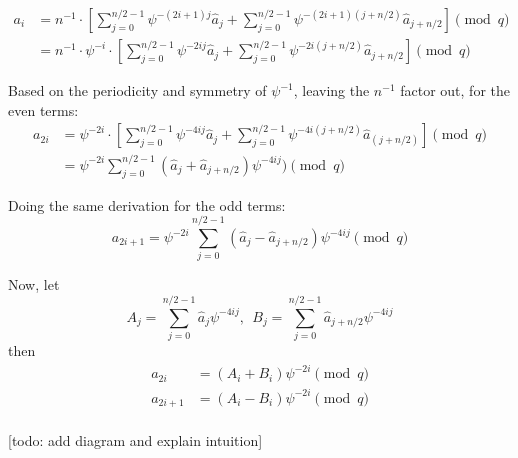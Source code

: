 \documentclass{article}
\begin{document}
\begin{align*}
    a_i &= n^{-1} \cdot \left[ \sum_{j=0}^{n/2-1} \psi^{-(2i + 1)j} \hat{a}_j 
    + \sum_{j=0}^{n/2-1} \psi^{-(2i + 1)(j+n/2)} \hat{a}_{j+n/2} \right] \pmod q \\
	&=  n^{-1} \cdot \psi^{-i} \cdot \left[ \sum_{j=0}^{n/2-1} \psi^{-2ij} \hat{a}_j 
    + \sum_{j=0}^{n/2-1} \psi^{-2i(j+n/2)} \hat{a}_{j+n/2} \right] \pmod q
\end{align*}


Based on the periodicity and symmetry of $\psi^{-1}$, leaving the $n^{-1}$ factor out, for the even terms:
\begin{align*}
    a_{2i} &= \psi^{-2i} \cdot \left[ \sum_{j=0}^{n/2-1} \psi^{-4ij} \hat{a}_j
	+ \sum_{j=0}^{n/2-1} \psi^{-4i(j+n/2)} \hat{a}_(j+n/2) \right] \pmod q \\
	   &= \psi^{-2i} \sum_{j=0}^{n/2-1} (\hat{a}_j + \hat{a}_{j+n/2}) \psi^{-4ij} ) \pmod q
\end{align*}

Doing the same derivation for the odd terms:
$$a_{2i+1} = \psi^{-2i} \sum_{j=0}^{n/2-1} ( \hat{a}_j - \hat{a}_{j+n/2} ) \psi^{-4ij} \pmod q$$


Now, let
$$A_j = \sum_{j=0}^{n/2-1} \hat{a}_j \psi^{-4ij},~~ B_j = \sum_{j=0}^{n/2-1} \hat{a}_{j +n/2} \psi^{-4ij}$$
then
\begin{align*}
    a_{2i} &= (A_i +B_i) \psi^{-2i} \pmod q\\
    a_{2i+1} &= (A_i -B_i) \psi^{-2i} \pmod q\\
\end{align*}

[todo: add diagram and explain intuition]



\end{document}

